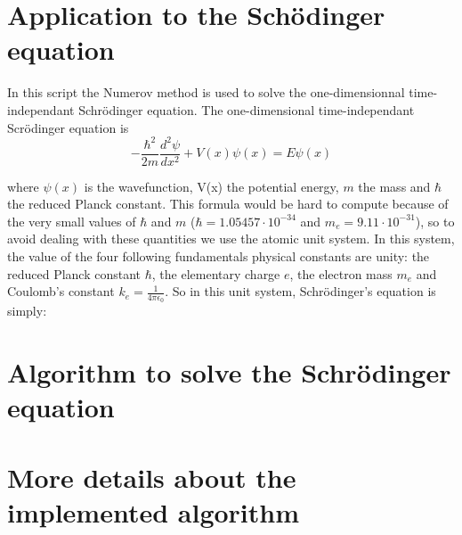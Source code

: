 \documentclass[12pt]{article}
\begin{document}
\section{Application to the Schödinger equation}

In this script the Numerov method is used to solve the one-dimensionnal time-independant Schrödinger equation. 
The one-dimensional time-independant Scrödinger equation is 
\begin{equation}
-\frac{\hbar^2}{2m}\frac{d^2\psi}{dx^2} + V(x)\psi(x) = E\psi(x)
\label{SchrodEq}
\end{equation}

where $\psi(x)$ is the wavefunction, V(x) the potential energy, $m$ the mass and $\hbar$ the reduced Planck constant. This formula would be hard to compute because of the very small values
of $\hbar$ and $m$ ($\hbar = 1.05457 \cdot 10^{-34}$ and $m_e = 9.11\cdot10^{-31}$), so to avoid dealing with these quantities we use the atomic unit system. In this system, the value of the four
following fundamentals physical constants are unity:  the reduced Planck constant $\hbar$, the elementary charge $e$, the electron mass $m_e$ and Coulomb's constant $k_e = \frac{1}{4\pi\epsilon_0}$.
So in this unit system, Schrödinger's equation is simply:



\section{Algorithm to solve the Schrödinger equation}



\section{More details about the implemented algorithm}
\end{document}
